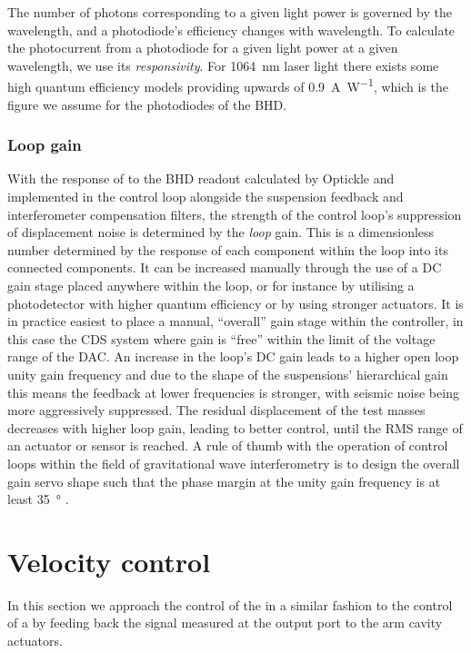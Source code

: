 The number of photons corresponding to a given light power is governed by the wavelength, and a photodiode's efficiency changes with wavelength. To calculate the photocurrent from a photodiode for a given light power at a given wavelength, we use its \emph{responsivity}. For \SI{1064}{\nano\meter} laser light there exists some high quantum efficiency models providing upwards of \SI{0.9}{\ampere\per\watt}, which is the figure we assume for the photodiodes of the \gls{BHD}.

\subsubsection{Loop gain}
With the response of \LMINUS{} to the \gls{BHD} readout calculated by Optickle and implemented in the control loop alongside the suspension feedback and interferometer compensation filters, the strength of the control loop's suppression of displacement noise is determined by the \emph{loop} gain. This is a dimensionless number determined by the response of each component within the loop into its connected components. It can be increased manually through the use of a \gls{DC} gain stage placed anywhere within the loop, or for instance by utilising a photodetector with higher quantum efficiency or by using stronger actuators. It is in practice easiest to place a manual, ``overall'' gain stage within the controller, in this case the \gls{CDS} system where gain is ``free'' within the limit of the voltage range of the \gls{DAC}. An increase in the loop's \gls{DC} gain leads to a higher open loop unity gain frequency and due to the shape of the suspensions' hierarchical gain this means the feedback at lower frequencies is stronger, with seismic noise being more aggressively suppressed. The residual displacement of the test masses decreases with higher loop gain, leading to better control, until the \gls{RMS} range of an actuator or sensor is reached. A rule of thumb with the operation of control loops within the field of gravitational wave interferometry is to design the overall gain servo shape such that the phase margin at the unity gain frequency is at least \SI{35}{\degree} \cite{Freise2003}.

\section{\label{sec:velocity-control}Velocity control}
In this section we approach the control of the \SSM{} in a similar fashion to the control of a \MI{} by feeding back the signal measured at the output port to the arm cavity actuators.

